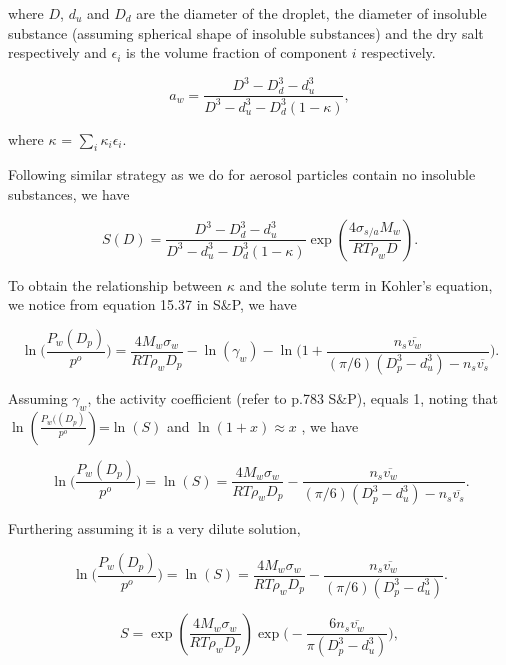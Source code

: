 \documentclass[12pt]{article}
\begin{document}
\begin{itemize}
where 
$D$, $d_{u}$ and $D_{d}$ are the diameter of the droplet, the diameter of insoluble substance (assuming spherical shape of insoluble substances) and the dry salt respectively and $\epsilon_{i}$ is the volume fraction of component $i$ respectively.

\begin{equation}
a_{w}= \frac {D^{3}-D_{d}^{3}-d_{u}^{3} }{D^{3}-d_{u}^{3}-D_{d}^{3} (1- \kappa)},
\end{equation}

where $\kappa$ = $\sum_{i} \kappa_{i} \epsilon_{i}$.


Following similar strategy as we do for aerosol particles contain no insoluble substances, we have

\begin{equation}
S(D)= \frac {D^{3}-D_{d}^{3}-d_{u}^{3} }{D^{3}-d_{u}^{3}-D_{d}^{3} (1- \kappa)}\exp (\frac{4 \sigma_{s/a} M_{w}} {RT\rho_wD}). 
\end{equation}


To obtain the relationship between $\kappa$ and the solute term in Kohler's equation, we notice from equation 15.37 in S$\&$P, we have 

\begin{equation}
\ln \Big(\frac{P_{w}(D_{p})}{p^{o}} \Big)=\frac{4M_{w}\sigma_{w}}{RT\rho_{w}D_{p}}-\ln(\gamma_{w})-\ln \Big(1+\frac{n_{s} {\overline{v_{w} } } } {(\pi/6) (D_{p}^{3}-d_{u}^{3}) - n_{s} \overline{v_{s}} } \Big).
\end{equation}

Assuming $\gamma_{w}$, the activity coefficient (refer to p.783 S$\&$P), equals 1, noting that $\ln(\frac{P_{w}((D_{p})}{p^{o}})$=$\ln(S)$  and $\ln(1+x)$$\approx x$  , we have

\begin{equation}
\ln \Big(\frac{P_{w}(D_{p})}{p^{o}} \Big)=\ln(S)=\frac{4M_{w}\sigma_{w}}{RT\rho_{w}D_{p}}-\frac{n_{s} {\overline{v_{w} } } } {(\pi/6) (D_{p}^{3}-d_{u}^{3}) - n_{s} \overline{v_{s}} } . 
\end{equation}

Furthering assuming it is a very dilute solution, 

\begin{equation}
\ln \Big(\frac{P_{w}(D_{p})}{p^{o}} \Big)=\ln(S)=\frac{4M_{w}\sigma_{w}}{RT\rho_{w}D_{p}}-\frac{n_{s} {\overline{v_{w} } } } {(\pi/6) (D_{p}^{3}-d_{u}^{3})} . 
\end{equation}

\begin{equation}
S=\exp{(\frac{4M_{w}\sigma_{w}}{RT\rho_{w}D_{p}})} \exp{\Big( - \frac{6 n_{s} {\overline{v_{w} } } } {\pi (D_{p}^{3} -d_{u}^{3})}\Big)},  
\end{equation}


\end{itemize}
\end{document}
